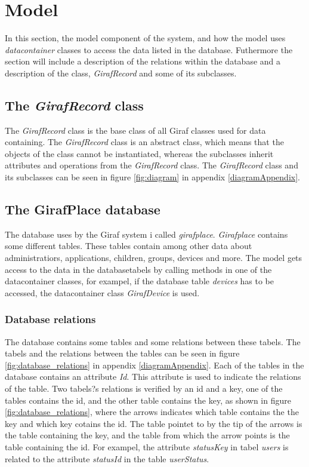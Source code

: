 \section{Model}
\label{model}

In this section, the model component of the system, and how the model uses \textit{datacontainer} classes to access the data listed in the database. Futhermore the section will include a description of the relations within the database and a description of the class, \textit{GirafRecord} and some of its subclasses.

\subsection{The \textit{GirafRecord} class}
The \textit{GirafRecord} class is the base class of all Giraf classes used for data containing. The \textit{GirafRecord} class is an abstract class, which means that the objects of the class cannot be instantiated, whereas the subclasses inherit attributes and operations from the \textit{GirafRecord} class. The \textit{GirafRecord} class and its subclasses can be seen in figure \ref{fig:diagram} in appendix \ref{diagramAppendix}.

\subsection{The GirafPlace database}
The database uses by the Giraf system i called \textit{girafplace}. \textit{Girafplace} contains some different tables. These tables contain among other data about administratiors, applications, children, groups, devices and more.
The model gets access to the data in the databasetabels by calling methods in one of the datacontainer classes, for exampel, if the database table \textit{devices} has to be accessed, the datacontainer class \textit{GirafDevice} is used.

\subsubsection{Database relations}
The database contains some tables and some relations between these tabels. The tabels and the relations between the tables can be seen in figure \ref{fig:database_relations} in appendix \ref{diagramAppendix}.
Each of the tables in the database contains an attribute \textit{Id}. This attribute is used to indicate the relations of the table. Two tabels?s relations is verified by an id and a key, one of the tables contains the id, and the other table contains the key, as shown in figure \ref{fig:database_relations}, where the arrows indicates which table contains the the key and which key cotains the id. The table pointet to by the tip of the arrows is the table containing the key, and the table from which the arrow points is the table containing the id. 
For exampel, the attribute  \textit{statusKey} in tabel \textit{users} is related to the attribute \textit{statusId} in the table \textit{userStatus}.